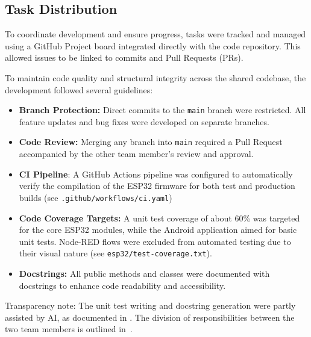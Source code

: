 \subsection{Task Distribution}
\label{subsec:task_distribution}

To coordinate development and ensure progress, tasks were tracked and managed using a GitHub Project board integrated directly with the code repository. This allowed issues to be linked to commits and Pull Requests (PRs).

To maintain code quality and structural integrity across the shared codebase, the development followed several guidelines:

\begin{itemize}
    \item \textbf{Branch Protection:} Direct commits to the \texttt{main} branch were restricted. All feature updates and bug fixes were developed on separate branches.
    \item \textbf{Code Review:} Merging any branch into \texttt{main} required a Pull Request accompanied by the other team member's review and approval.
    \item \textbf{CI Pipeline}: A GitHub Actions pipeline was configured to automatically verify the compilation of the ESP32 firmware for both test and production builds (see \texttt{.github/workflows/ci.yaml})
    \item \textbf{Code Coverage Targets:} A unit test coverage of about 60\% was targeted for the core ESP32 modules, while the Android application aimed for basic unit tests. Node-RED flows were excluded from automated testing due to their visual nature (see \texttt{esp32/test-coverage.txt}).
    \item \textbf{Docstrings:} All public methods and classes were documented with docstrings to enhance code readability and accessibility.
\end{itemize}

Transparency note: The unit test writing and docstring generation were partly assisted by AI, as documented in .
The division of responsibilities between the two team members is outlined in~.

